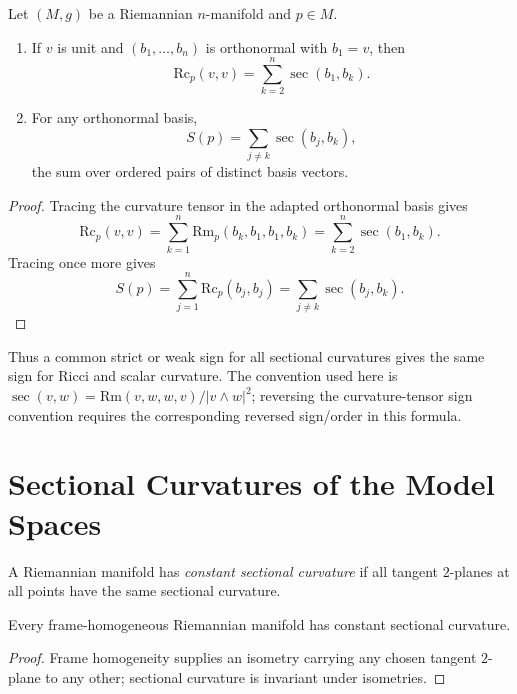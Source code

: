 \begin{proposition}
\label{prop:geometric-interpretation-ricci-scalar-curvatures}
Let $(M,g)$ be a Riemannian $n$-manifold and $p\in M$.
\begin{enumerate}
\item[(a)] If $v$ is unit and $(b_1,\ldots,b_n)$ is orthonormal with $b_1=v$,
then
\[
\mathrm{Rc}_p(v,v)=\sum_{k=2}^n\sec(b_1,b_k).
\]
\item[(b)] For any orthonormal basis,
\[
S(p)=\sum_{j\ne k}\sec(b_j,b_k),
\]
the sum over ordered pairs of distinct basis vectors.
\end{enumerate}
\end{proposition}

\begin{proof}
\sketch
Tracing the curvature tensor in the adapted orthonormal basis gives
\[
\mathrm{Rc}_p(v,v)
=\sum_{k=1}^n\mathrm{Rm}_p(b_k,b_1,b_1,b_k)
=\sum_{k=2}^n\sec(b_1,b_k).
\]
Tracing once more gives
\[
S(p)=\sum_{j=1}^n\mathrm{Rc}_p(b_j,b_j)
=\sum_{j\ne k}\sec(b_j,b_k).
\]
\end{proof}

Thus a common strict or weak sign for all sectional curvatures gives the same
sign for Ricci and scalar curvature.  The convention used here is
$\sec(v,w)=\mathrm{Rm}(v,w,w,v)/|v\wedge w|^2$; reversing the curvature-tensor
sign convention requires the corresponding reversed sign/order in this
formula.

\section{Sectional Curvatures of the Model Spaces}

A Riemannian manifold has \emph{constant sectional curvature} if all tangent
$2$-planes at all points have the same sectional curvature.

\begin{lemma}
\label{lem:frame-homogeneous-constant-sectional-curvature}
Every frame-homogeneous Riemannian manifold has constant sectional curvature.
\end{lemma}

\begin{proof}
\sketch
Frame homogeneity supplies an isometry carrying any chosen tangent $2$-plane
to any other; sectional curvature is invariant under isometries.
\end{proof}

